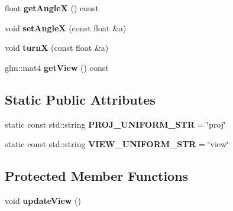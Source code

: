 \begin{DoxyCompactItemize}
\item 
\hypertarget{class_perspective_camera_a05fc504e191d0ab3abd0ef8189a19e1f}{}float {\bfseries get\+Angle\+X} () const \label{class_perspective_camera_a05fc504e191d0ab3abd0ef8189a19e1f}

\item 
\hypertarget{class_perspective_camera_a6af5d666cd398e375e90ac06364d3545}{}void {\bfseries set\+Angle\+X} (const float \&a)\label{class_perspective_camera_a6af5d666cd398e375e90ac06364d3545}

\item 
\hypertarget{class_perspective_camera_a6bbd0338716891b778c5ce70f1f5fdda}{}void {\bfseries turn\+X} (const float \&a)\label{class_perspective_camera_a6bbd0338716891b778c5ce70f1f5fdda}

\item 
\hypertarget{class_perspective_camera_aa178b372867ae7fa837d83ed506f1f36}{}glm\+::mat4 {\bfseries get\+View} () const \label{class_perspective_camera_aa178b372867ae7fa837d83ed506f1f36}

\end{DoxyCompactItemize}
\subsection*{Static Public Attributes}
\begin{DoxyCompactItemize}
\item 
\hypertarget{class_perspective_camera_a6f9a19c4ebd1f9037707bae4ddba2249}{}static const std\+::string {\bfseries P\+R\+O\+J\+\_\+\+U\+N\+I\+F\+O\+R\+M\+\_\+\+S\+T\+R} = \char`\"{}proj\char`\"{}\label{class_perspective_camera_a6f9a19c4ebd1f9037707bae4ddba2249}

\item 
\hypertarget{class_perspective_camera_a97517e41a2a0298b6d832a2fc7fb205b}{}static const std\+::string {\bfseries V\+I\+E\+W\+\_\+\+U\+N\+I\+F\+O\+R\+M\+\_\+\+S\+T\+R} = \char`\"{}view\char`\"{}\label{class_perspective_camera_a97517e41a2a0298b6d832a2fc7fb205b}

\end{DoxyCompactItemize}
\subsection*{Protected Member Functions}
\begin{DoxyCompactItemize}
\item 
\hypertarget{class_perspective_camera_a1ede24481c69a76465f25a5ac920c1be}{}void {\bfseries update\+View} ()\label{class_perspective_camera_a1ede24481c69a76465f25a5ac920c1be}

\end{DoxyCompactItemize}
